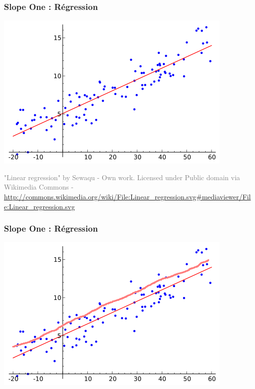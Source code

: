 \documentclass[t]{beamer}
\newcommand\gray[1]{\textcolor{gray}{#1}}
\begin{document}
\begin{frame}
  \frametitle{Slope One : Régression}
  
  \vspace{1cm}
  \centerline{\includegraphics[height=.4\textheight]{linear-regression.png}}

  \vspace{1cm}
  \gray{\small "Linear regression" by Sewaqu - Own work. Licensed
    under Public domain via Wikimedia Commons -
    {\footnotesize\url{http://commons.wikimedia.org/wiki/File:Linear\_regression.svg\#mediaviewer/File:Linear_regression.svg}}}

\end{frame}

\begin{frame}
  \frametitle{Slope One : Régression}
  
  \vspace{1cm}
  \centerline{\includegraphics[height=.4\textheight]{linear-regression-2.png}}

\end{frame}
\end{document}
